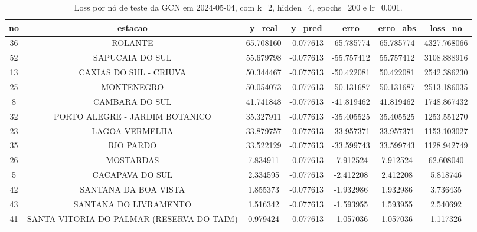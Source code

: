 \begin{table}[h]
\centering
\caption{Loss por nó de teste da GCN em 2024-05-04, com k=2, hidden=4, epochs=200 e lr=0.001.}
\label{tab:gcn_loss_nodes_k2_hidden4}
\begin{tabular}{ccccccc}
\toprule
no & estacao & y\_real & y\_pred & erro & erro\_abs & loss\_no \\
\midrule
36 & ROLANTE & 65.708160 & -0.077613 & -65.785774 & 65.785774 & 4327.768066 \\
52 & SAPUCAIA DO SUL & 55.679798 & -0.077613 & -55.757412 & 55.757412 & 3108.888916 \\
13 & CAXIAS DO SUL - CRIUVA & 50.344467 & -0.077613 & -50.422081 & 50.422081 & 2542.386230 \\
25 & MONTENEGRO & 50.054073 & -0.077613 & -50.131687 & 50.131687 & 2513.186035 \\
8 & CAMBARA DO SUL & 41.741848 & -0.077613 & -41.819462 & 41.819462 & 1748.867432 \\
32 & PORTO ALEGRE - JARDIM BOTANICO & 35.327911 & -0.077613 & -35.405525 & 35.405525 & 1253.551270 \\
23 & LAGOA VERMELHA & 33.879757 & -0.077613 & -33.957371 & 33.957371 & 1153.103027 \\
35 & RIO PARDO & 33.522129 & -0.077613 & -33.599743 & 33.599743 & 1128.942749 \\
26 & MOSTARDAS & 7.834911 & -0.077613 & -7.912524 & 7.912524 & 62.608040 \\
5 & CACAPAVA DO SUL & 2.334595 & -0.077613 & -2.412208 & 2.412208 & 5.818746 \\
42 & SANTANA DA BOA VISTA & 1.855373 & -0.077613 & -1.932986 & 1.932986 & 3.736435 \\
43 & SANTANA DO LIVRAMENTO & 1.516342 & -0.077613 & -1.593955 & 1.593955 & 2.540692 \\
41 & SANTA VITORIA DO PALMAR (RESERVA DO TAIM) & 0.979424 & -0.077613 & -1.057036 & 1.057036 & 1.117326 \\
\bottomrule
\end{tabular}
\end{table}
